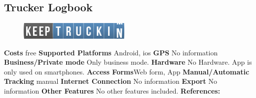 \begin{singlespace}
\section{Trucker Logbook}
\begin{figure}
  \begin{center}
    \includegraphics[width=0.48\textwidth]{bilder/trucker}
  \end{center}
\end{figure}
\textbf{Costs} free
\newline\newline
\textbf{Supported Platforms} Android, \gls{ios}
\newline\newline
\textbf{GPS} No information
\newline\newline
\textbf{Business/Private mode} Only business mode.
\newline\newline
\textbf{Hardware} No Hardware. App is only used on smartphones.
\newline\newline
\textbf{Access Forms}Web form, App
\newline\newline
\textbf{Manual/Automatic Tracking} manual
\newline\newline
\textbf{Internet Connection} No information
\newline\newline
\textbf{Export} No information
\newline\newline
\textbf{Other Features} No other features included.
\newline\newline
\textbf{References:} \cite{Trucker_Logbook}
\newpage
\clearpageauthor

\end{singlespace}
